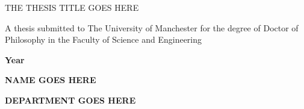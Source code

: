 \documentclass[../main.tex]{subfiles}
\begin{document}
	
\begin{titlepage}
	\begin{center}

                \vspace*{3cm}
		
		\Huge{\textsc{THE THESIS TITLE GOES HERE}}
		
		\vspace{3cm}
		
		\large{A thesis submitted to The University of Manchester for the degree of Doctor of Philosophy in the Faculty of Science and Engineering}
		
		\vspace{3cm}
		
		\textbf{\Large{Year}}
		
		\vspace{3cm}
		
		\textbf{\Large{NAME GOES HERE}}
		
		\vspace{1cm}
		
		\textbf{\Large{DEPARTMENT GOES HERE}}	
		
	\end{center}
\end{titlepage}
\end{document}
